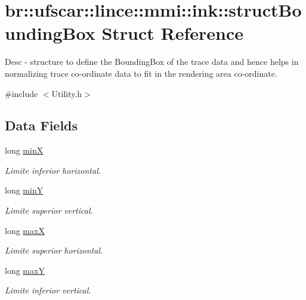 \hypertarget{structbr_1_1ufscar_1_1lince_1_1mmi_1_1ink_1_1structBoundingBox}{
\section{br::ufscar::lince::mmi::ink::structBoundingBox Struct Reference}
\label{structbr_1_1ufscar_1_1lince_1_1mmi_1_1ink_1_1structBoundingBox}
}


Desc -\/ structure to define the BoundingBox of the trace data and hence helps in normalizing trace co-\/ordinate data to fit in the rendering area co-\/ordinate.  




{\ttfamily \#include $<$Utility.h$>$}

\subsection*{Data Fields}
\begin{DoxyCompactItemize}
\item 
long \hyperlink{structbr_1_1ufscar_1_1lince_1_1mmi_1_1ink_1_1structBoundingBox_a0ee9f3312a600d5e18864edff981aff2}{minX}
\begin{DoxyCompactList}\small\item\em Limite inferior horizontal. \item\end{DoxyCompactList}\item 
long \hyperlink{structbr_1_1ufscar_1_1lince_1_1mmi_1_1ink_1_1structBoundingBox_a45f3a13363b8016024e8ccc5c39eae70}{minY}
\begin{DoxyCompactList}\small\item\em Limite superior vertical. \item\end{DoxyCompactList}\item 
long \hyperlink{structbr_1_1ufscar_1_1lince_1_1mmi_1_1ink_1_1structBoundingBox_a65a9d52b3d44834668ec591c9593af24}{maxX}
\begin{DoxyCompactList}\small\item\em Limite superior horizontal. \item\end{DoxyCompactList}\item 
long \hyperlink{structbr_1_1ufscar_1_1lince_1_1mmi_1_1ink_1_1structBoundingBox_ae63289fbb7f7a17ac4e44837edf362d0}{maxY}
\begin{DoxyCompactList}\small\item\em Limite inferior vertical. \item\end{DoxyCompactList}\end{DoxyCompactItemize}


